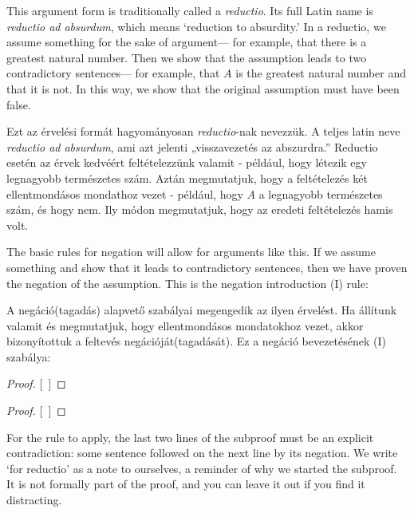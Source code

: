 This argument form is traditionally called a \emph{reductio}. Its full Latin name is \emph{reductio ad absurdum}, which means `reduction to absurdity.' In a reductio, we assume something for the sake of argument--- for example, that there is a greatest natural number. Then we show that the assumption leads to two contradictory sentences--- for example, that $A$ is the greatest natural number and that it is not. In this way, we show that the original assumption must have been false.

Ezt az érvelési formát hagyományosan \emph{reductio}-nak nevezzük. A teljes latin neve \emph{reductio ad absurdum}, ami azt jelenti „visszavezetés az abszurdra.” Reductio esetén az érvek kedvéért feltételezzünk valamit - például, hogy létezik egy legnagyobb természetes szám. Aztán megmutatjuk, hogy a feltételezés két ellentmondásos mondathoz vezet - például, hogy $A$ a legnagyobb természetes szám, és hogy nem. Ily módon megmutatjuk, hogy az eredeti feltételezés hamis volt.


The basic rules for negation will allow for arguments like this. If we assume something and show that it leads to contradictory sentences, then we have proven the negation of the assumption. This is the negation introduction ({\enot}I) rule:

A negáció(tagadás) alapvető szabályai megengedik az ilyen érvelést. Ha állítunk valamit és megmutatjuk, hogy ellentmondásos mondatokhoz vezet, akkor bizonyítottuk a feltevés negációját(tagadását). Ez a negáció bevezetésének ({\enot}I) szabálya:

\begin{proof}
\open
\close
{}[\ ]{\enot{}}
\end{proof}

\begin{proof}
\open
\close
{}[\ ]{\enot{}}
\end{proof}

For the rule to apply, the last two lines of the subproof must be an explicit contradiction: some sentence followed on the next line by its negation. We write `for reductio' as a note to ourselves, a reminder of why we started the subproof. It is not formally part of the proof, and you can leave it out if you find it distracting.

